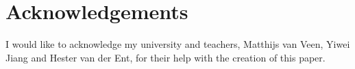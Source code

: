 \section{Acknowledgements}
I would like to acknowledge my university and teachers, Matthijs van Veen, Yiwei Jiang and Hester van der Ent, for their help with the creation of this paper.